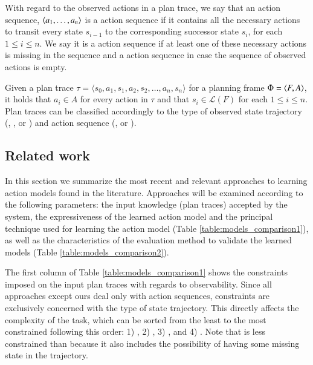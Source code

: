 With regard to the observed actions in a plan trace, we say that an action sequence, ${\langle a_1, \ldots, a_n \rangle}$ is a \FO action sequence if it contains all the necessary actions to transit every state $s_{i-1}$ to the corresponding successor state $s_{i}$, for each {\small $1\leq i\le n$}. We say it is a \PO action sequence if at least one of these necessary actions is missing in the sequence and a \NO action sequence in case the sequence of observed actions is empty.

Given a  plan trace $\tau = \langle s_0, a_1, s_1, a_2, s_2, \ldots, a_n, s_n \rangle$ for a planning frame $\Phi={\langle F,A \rangle}$, it holds that $a_i\in A$ for every action in $\tau$ and that $s_i \in \mathcal{L}(F)$ for each {\small $1\leq i\le n$}. Plan traces can be classified accordingly to the type of observed state trajectory (\FO, \POstar, \PO or \NO) and action sequence (\FO, \PO or \NO).




\subsection{Related work}
\label{related_work}

In this section we summarize the most recent and relevant approaches to learning action models found in the literature. Approaches will be examined according to the following parameters: the input knowledge (plan traces) accepted by the system, the expressiveness of the learned action model and the principal technique used for learning the action model (Table \ref{table:models_comparison1}), as well as the characteristics of the evaluation method to validate the learned models (Table \ref{table:models_comparison2}).

The first column of Table \ref{table:models_comparison1} shows the constraints imposed on the input plan traces with regards to observability. Since all approaches except ours deal only with \FO action sequences, constraints are exclusively concerned with the type of state trajectory. This directly affects the complexity of the task, which can be sorted from the least to the most constrained following this order: 1) \NO, 2) \PO, 3) \POstar, and 4) \FO. Note that \PO is less constrained than \POstar because it also includes the possibility of having some missing state in the trajectory.

